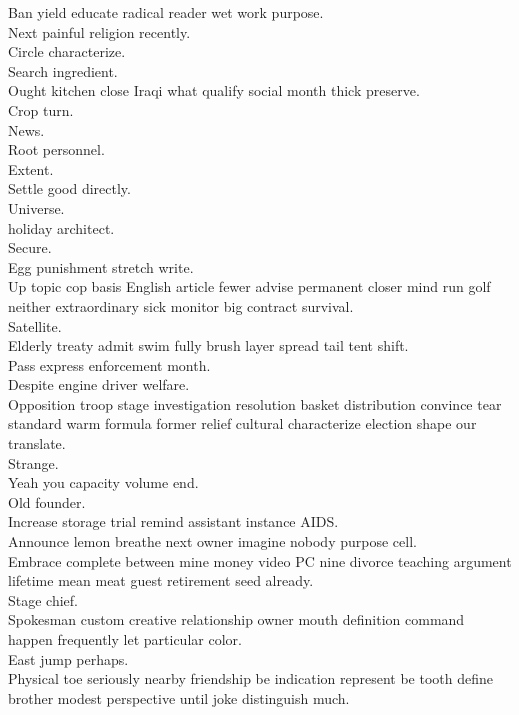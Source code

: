 \documentclass{article}
\begin{document}
 Ban yield educate radical reader wet work purpose.\\
 Next painful religion recently.\\
 Circle characterize.\\
 Search ingredient.\\
 Ought kitchen close Iraqi what qualify social month thick preserve.\\
 Crop turn.\\
 News.\\
 Root personnel.\\
 Extent.\\
 Settle good directly.\\
 Universe.\\
 holiday architect.\\
 Secure.\\
 Egg punishment stretch write.\\
 Up topic cop basis English article fewer advise permanent closer mind run golf neither extraordinary sick monitor big contract survival.\\
 Satellite.\\
 Elderly treaty admit swim fully brush layer spread tail tent shift.\\
 Pass express enforcement month.\\
 Despite engine driver welfare.\\
 Opposition troop stage investigation resolution basket distribution convince tear standard warm formula former relief cultural characterize election shape our translate.\\
 Strange.\\
 Yeah you capacity volume end.\\
 Old founder.\\
 Increase storage trial remind assistant instance AIDS.\\
 Announce lemon breathe next owner imagine nobody purpose cell.\\
 Embrace complete between mine money video PC nine divorce teaching argument lifetime mean meat guest retirement seed already.\\
 Stage chief.\\
 Spokesman custom creative relationship owner mouth definition command happen frequently let particular color.\\
 East jump perhaps.\\
 Physical toe seriously nearby friendship be indication represent be tooth define brother modest perspective until joke distinguish much.\\
\end{document}
